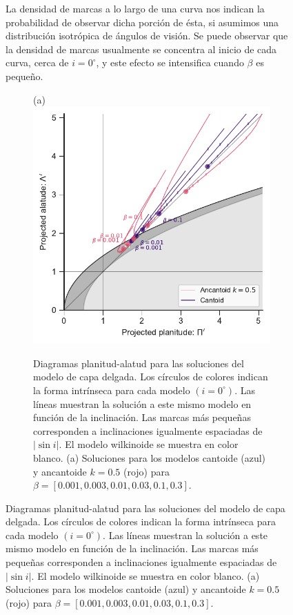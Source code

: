 \begin{figure}
La densidad de marcas a lo largo de una curva nos indican la probabilidad de observar dicha porción de ésta, si asumimos una distribución isotrópica de ángulos de visión. Se puede observar que la densidad de marcas usualmente se concentra al inicio de cada curva, cerca de $i=0^\circ$, y este efecto se intensifica cuando $\beta$ es pequeño.

\begin{figure}
  \centering
    (a)  \\
    \includegraphics[width=0.7\linewidth]{./Figures/ancantoid-R90-vs-Rc-a}                                                                    
  \caption[Diagrama planitud-alatud aparente para las soluciones del modelo de capa delgada.]{Diagramas planitud-alatud para las soluciones del modelo de capa delgada. Los círculos de colores indican la forma intrínseca para cada modelo $(i=0^\circ)$. Las líneas muestran la solución a este mismo modelo en función de la inclinación. Las marcas más pequeñas corresponden a inclinaciones igualmente espaciadas de $|\sin i|$. El modelo wilkinoide se muestra en color blanco. (a) Soluciones para los modelos cantoide (azul) y ancantoide $k=0.5$ (rojo) para $\beta=[0.001, 0.003, 0.01, 0.03, 0.1, 0.3]$.}
  \label{fig:Lambda-Pi-diagram}
\end{figure}


\end{figure}
